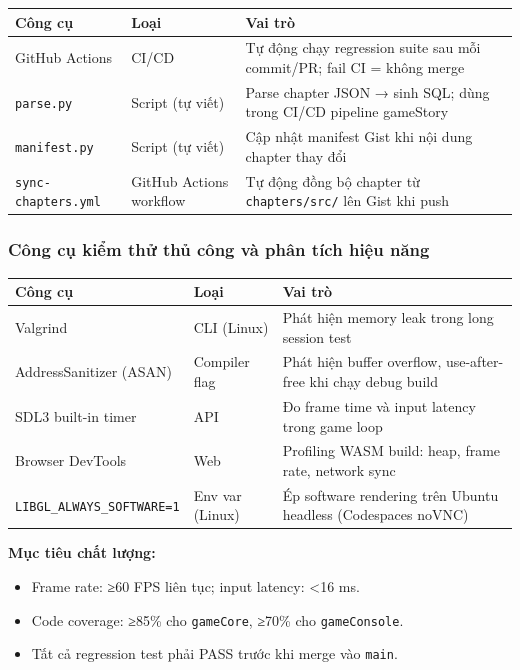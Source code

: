 \documentclass[12pt,a4paper]{article}
\begin{document}
\begin{tabularx}{\linewidth}{|l|l|X|}
\hline
\rowcolor{gray!20}
\textbf{Công cụ} & \textbf{Loại} & \textbf{Vai trò} \\
\hline
GitHub Actions & CI/CD & Tự động chạy regression suite sau mỗi commit/PR; fail CI = không merge \\
\hline
\texttt{parse.py} & Script (tự viết) & Parse chapter JSON → sinh SQL; dùng trong CI/CD pipeline gameStory \\
\hline
\texttt{manifest.py} & Script (tự viết) & Cập nhật manifest Gist khi nội dung chapter thay đổi \\
\hline
\texttt{sync-chapters.yml} & GitHub Actions workflow & Tự động đồng bộ chapter từ \texttt{chapters/src/} lên Gist khi push \\
\hline
\end{tabularx}

\subsubsection{Công cụ kiểm thử thủ công và phân tích hiệu năng}

\begin{tabularx}{\linewidth}{|l|l|X|}
\hline
\rowcolor{gray!20}
\textbf{Công cụ} & \textbf{Loại} & \textbf{Vai trò} \\
\hline
Valgrind & CLI (Linux) & Phát hiện memory leak trong long session test \\
\hline
AddressSanitizer (ASAN) & Compiler flag & Phát hiện buffer overflow, use-after-free khi chạy debug build \\
\hline
SDL3 built-in timer & API & Đo frame time và input latency trong game loop \\
\hline
Browser DevTools & Web & Profiling WASM build: heap, frame rate, network sync \\
\hline
\texttt{LIBGL\_ALWAYS\_SOFTWARE=1} & Env var (Linux) & Ép software rendering trên Ubuntu headless (Codespaces noVNC) \\
\hline
\end{tabularx}

\vspace{4pt}
\noindent\textbf{Mục tiêu chất lượng:}
\begin{itemize}[nosep]
    \item Frame rate: ≥60 FPS liên tục; input latency: <16 ms.
    \item Code coverage: ≥85\% cho \texttt{gameCore}, ≥70\% cho \texttt{gameConsole}.
    \item Tất cả regression test phải PASS trước khi merge vào \texttt{main}.
\end{itemize}

\label{LastPageToolsetList}
\end{document}
